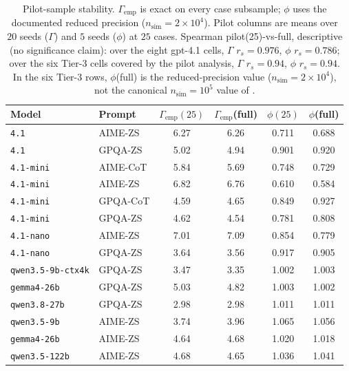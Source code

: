 \documentclass{article}
\newcommand{\agreementIndex}{\Gamma}
\begin{document}
\begin{table}[H]
\centering
\caption{Pilot-sample stability. $\agreementIndex_{\mathrm{emp}}$ is exact on every
case subsample; $\phi$ uses the documented reduced precision
($n_{\mathrm{sim}}=2\times10^4$). Pilot columns are means over $20$
seeds ($\agreementIndex$) and $5$ seeds ($\phi$) at $25$ cases. Spearman
pilot(25)-vs-full, descriptive (no significance claim): over the eight
gpt-4.1 cells, $\agreementIndex$ $r_s=0.976$, $\phi$ $r_s=0.786$; over the six
Tier-3 cells covered by the pilot analysis, $\agreementIndex$ $r_s=0.94$, $\phi$
$r_s=0.94$. In the six Tier-3 rows, $\phi$(full) is the reduced-precision value
($n_{\mathrm{sim}}=2\times10^4$), not the canonical
$n_{\mathrm{sim}}=10^5$ value of .}
\label{tab:pilot}
\begin{tabular}{llcccc}
\toprule
Model & Prompt & $\agreementIndex_{\mathrm{emp}}(25)$ & $\agreementIndex_{\mathrm{emp}}$(full) & $\phi(25)$ & $\phi$(full) \\
\midrule
\texttt{4.1} & AIME-ZS & 6.27 & 6.26 & 0.711 & 0.688 \\
\texttt{4.1} & GPQA-ZS & 5.02 & 4.94 & 0.901 & 0.920 \\
\texttt{4.1-mini} & AIME-CoT & 5.84 & 5.69 & 0.748 & 0.729 \\
\texttt{4.1-mini} & AIME-ZS & 6.82 & 6.76 & 0.610 & 0.584 \\
\texttt{4.1-mini} & GPQA-CoT & 4.59 & 4.65 & 0.849 & 0.927 \\
\texttt{4.1-mini} & GPQA-ZS & 4.62 & 4.54 & 0.781 & 0.808 \\
\texttt{4.1-nano} & AIME-ZS & 7.01 & 7.09 & 0.854 & 0.779 \\
\texttt{4.1-nano} & GPQA-ZS & 3.64 & 3.56 & 0.917 & 0.905 \\
\midrule
\texttt{qwen3.5-9b-ctx4k} & GPQA-ZS & 3.47 & 3.35 & 1.002 & 1.003 \\
\texttt{gemma4-26b} & GPQA-ZS & 5.03 & 4.82 & 1.003 & 1.002 \\
\texttt{qwen3.8-27b} & GPQA-ZS & 2.98 & 2.98 & 1.011 & 1.011 \\
\texttt{qwen3.5-9b} & AIME-ZS & 3.74 & 3.96 & 1.065 & 1.056 \\
\texttt{gemma4-26b} & AIME-ZS & 4.64 & 4.68 & 1.020 & 1.018 \\
\texttt{qwen3.5-122b} & AIME-ZS & 4.68 & 4.65 & 1.036 & 1.041 \\
\bottomrule
\end{tabular}
\end{table}
\end{document}
